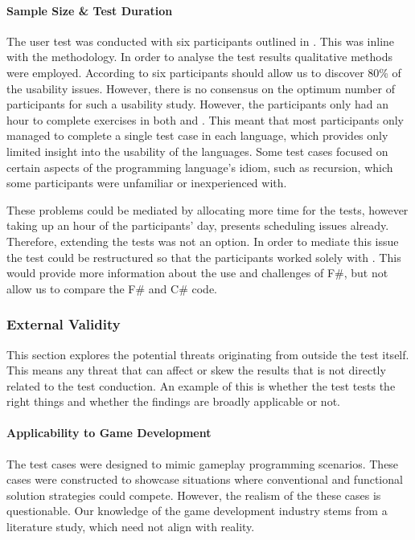 \paragraph{Sample Size \& Test Duration}
The user test was conducted with six participants outlined in . This was inline with the \champagne methodology. In order to analyse the test results qualitative methods were employed. According to \cite{virzi1992refining} six participants should allow us to discover 80\% of the usability issues. However, there is no consensus on the optimum number of participants for such a usability study\cite{hwang2010number}. However, the participants only had an hour to complete exercises in both \fs and \cs. This meant that most participants only managed to complete a single test case in each language, which provides only limited insight into the usability of the languages. Some test cases focused on certain aspects of the programming language's idiom, such as recursion, which some participants were unfamiliar or inexperienced with.

These problems could be mediated by allocating more time for the tests, however taking up an hour of the participants' day, presents scheduling issues already. Therefore, extending the tests was not an option. In order to mediate this issue the test could be restructured so that the participants worked solely with \fs. This would provide more information about the use and challenges of F\#, but not allow us to compare the F\# and C\# code.

\subsubsection{External Validity}
This section explores the potential threats originating from outside the test itself. This means any threat that can affect or skew the results that is not directly related to the test conduction. An example of this is whether the test tests the right things and whether the findings are broadly applicable or not.

\paragraph{Applicability to Game Development}
The test cases were designed to mimic gameplay programming scenarios. These cases were constructed to showcase situations where conventional and functional solution strategies could compete. However, the realism of the these cases is questionable. Our knowledge of the game development industry stems from a literature study, which need not align with reality.

